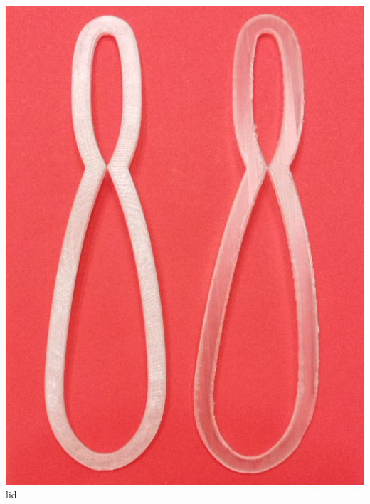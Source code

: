 \documentclass[a4paper,9pt]{article}
\begin{document}
\begin{minipage}{0.48\linewidth}
        \centering
        \includegraphics[width=.95\linewidth]{Images/t1.jpg}
        \\{lid}
            \end{minipage}
    \hfill
\end{document}
